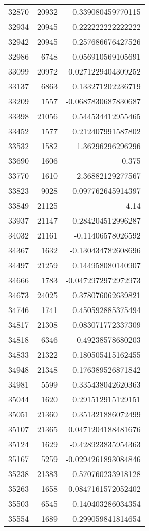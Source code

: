 \begin{tabular}{r | r | r}
32870 & 20932 & 0.339080459770115 \\
32934 & 20945 & 0.222222222222222 \\
32942 & 20945 & 0.257686676427526 \\
32986 & 6748 & 0.056910569105691 \\
33099 & 20972 & 0.0271229404309252 \\
33137 & 6863 & 0.133271202236719 \\
33209 & 1557 & -0.0687830687830687 \\
33398 & 21056 & 0.544534412955465 \\
33452 & 1577 & 0.212407991587802 \\
33532 & 1582 & 1.36296296296296 \\
33690 & 1606 & -0.375 \\
33770 & 1610 & -2.36882129277567 \\
33823 & 9028 & 0.097762645914397 \\
33849 & 21125 & 4.14 \\
33937 & 21147 & 0.284204512996287 \\
34032 & 21161 & -0.11406578026592 \\
34367 & 1632 & -0.130434782608696 \\
34497 & 21259 & 0.144958080140907 \\
34666 & 1783 & -0.0472972972972973 \\
34673 & 24025 & 0.378076062639821 \\
34746 & 1741 & 0.450592885375494 \\
34817 & 21308 & -0.083071772337309 \\
34818 & 6346 & 0.49238578680203 \\
34833 & 21322 & 0.180505415162455 \\
34948 & 21348 & 0.176389526871842 \\
34981 & 5599 & 0.335438042620363 \\
35044 & 1620 & 0.291512915129151 \\
35051 & 21360 & 0.351321886072499 \\
35107 & 21365 & 0.0471204188481676 \\
35124 & 1629 & -0.428923835954363 \\
35167 & 5259 & -0.0294261893084846 \\
35238 & 21383 & 0.570760233918128 \\
35263 & 1658 & 0.0847161572052402 \\
35503 & 6545 & -0.140403286034354 \\
35554 & 1689 & 0.299059841814654 \\

\end{tabular}
